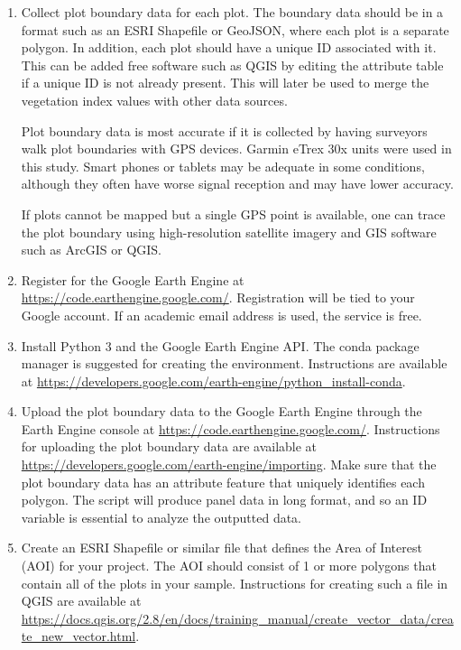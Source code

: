 \documentclass{article}
\begin{document}
\begin{enumerate}
  \item Collect plot boundary data for each plot. The boundary data should be in a format such as an ESRI Shapefile or GeoJSON, where each plot is a separate polygon. In addition, each plot should have a unique ID associated with it. This can be added free software such as QGIS by editing the attribute table if a unique ID is not already present. This will later be used to merge the vegetation index values with other data sources. 

  Plot boundary data is most accurate if it is collected by having surveyors walk plot boundaries with GPS devices. Garmin eTrex 30x units were used in this study. Smart phones or tablets may be adequate in some conditions, although they often have worse signal reception and may have lower accuracy. 

  If plots cannot be mapped but a single GPS point is available, one can trace the plot boundary using high-resolution satellite imagery and GIS software such as ArcGIS or QGIS. 

  \item Register for the Google Earth Engine at \url{https://code.earthengine.google.com/}. Registration will be tied to your Google account. If an academic email address is used, the service is free. 

  \item Install Python 3 and the Google Earth Engine API. The conda package manager is suggested for creating the environment. Instructions are available at \url{https://developers.google.com/earth-engine/python_install-conda}. 

  \item Upload the plot boundary data to the Google Earth Engine through the Earth Engine console at \url{https://code.earthengine.google.com/}. Instructions for uploading the plot boundary data are available at \url{https://developers.google.com/earth-engine/importing}. Make sure that the plot boundary data has an attribute feature that uniquely identifies each polygon. The script will produce panel data in long format, and so an ID variable is essential to analyze the outputted data.

  \item Create an ESRI Shapefile or similar file that defines the Area of Interest (AOI) for your project. The AOI should consist of 1 or more polygons that contain all of the plots in your sample. Instructions for creating such a file in QGIS are available at \url{https://docs.qgis.org/2.8/en/docs/training_manual/create_vector_data/create_new_vector.html}. 


\end{enumerate}
\end{document}
